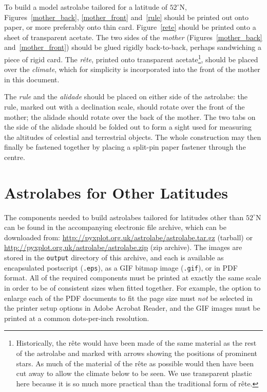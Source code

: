\documentclass[a4paper,onecolumn,10pt]{article}
\begin{document}
To build a model astrolabe tailored for a latitude of $52^\circ$N,
Figures~\ref{mother_back}, \ref{mother_front} and~\ref{rule} should be printed
out onto paper, or more preferably onto thin card.  Figure~\ref{rete} should be
printed onto a sheet of transparent acetate.  The two sides of the {\it mother}
(Figures~\ref{mother_back} and~\ref{mother_front}) should be glued rigidly
back-to-back, perhaps sandwiching a piece of rigid card. The {\it r\^ete},
printed onto transparent acetate\footnote{Historically, the r\^ete would have
been made of the same material as the rest of the astrolabe and marked with
arrows showing the positions of prominent stars. As much of the material of the
r\^ete as possible would then have been cut away to allow the climate below to
be seen. We use transparent plastic here because it is so much more practical
than the traditional form of r\^ete.}, should be placed over the {\it climate},
which for simplicity is incorporated into the front of the mother in this
document.

The {\it rule} and the {\it alidade} should be placed on either side of the
astrolabe: the rule, marked out with a declination scale, should rotate over
the front of the mother; the alidade should rotate over the back of the mother.
The two tabs on the side of the alidade should be folded out to form a sight
used for measuring the altitudes of celestial and terrestrial objects.  The
whole construction may then finally be fastened together by placing a split-pin
paper fastener through the centre.

\section*{Astrolabes for Other Latitudes}

The components needed to build astrolabes tailored for latitudes other than
$52^\circ$N can be found in the accompanying electronic file archive, which can
be downloaded from:
\vspace{1mm}\newline\noindent
\url{http://pyxplot.org.uk/astrolabe/astrolabe.tar.gz} (tarball)
\vspace{1mm}\newline\noindent or
\vspace{1mm}\newline\noindent
\url{http://pyxplot.org.uk/astrolabe/astrolabe.zip} (zip archive).
\vspace{1mm}\newline\noindent
The images are stored in the {\tt output} directory of this
archive, and each is available as encapsulated postscript ({\tt .eps}), as a
GIF bitmap image ({\tt .gif}), or in PDF format.  All of the required
components must be printed at exactly the same scale in order to be of
consistent sizes when fitted together. For example, the option to enlarge each
of the PDF documents to fit the page size must {\it not} be selected in the
printer setup options in Adobe Acrobat Reader, and the GIF images must be
printed at a common dots-per-inch resolution.
\end{document}
